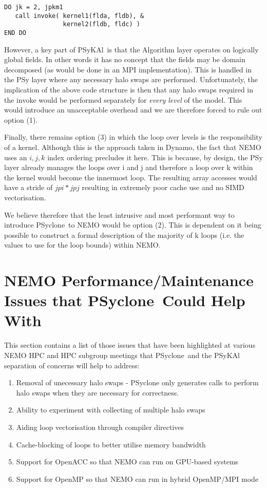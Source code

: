 \documentclass{article}
\newcommand{\psykal}{{PS}y{KA}l}
\newcommand{\psyclone}{{PS}yclone}
\begin{document}
\begin{verbatim}
DO jk = 2, jpkm1
   call invoke( kernel1(flda, fldb), &
                kernel2(fldb, fldc) )
END DO
\end{verbatim}

However, a key part of \psykal\ is that the Algorithm layer operates on
logically global fields. In other words it has no concept that the
fields may be domain decomposed (as would be done in an MPI
implementation). This is handled in the PSy layer where any necessary
halo swaps are performed. Unfortunately, the implication of the above
code structure is then that any halo swaps required in the invoke
would be performed separately for \emph{every level} of the
model. This would introduce an unacceptable overhead and we are
therefore forced to rule out option (1).

Finally, there remains option (3) in which the loop over levels is the
responsibility of a kernel. Although this is the approach taken in
Dynamo, the fact that NEMO uses an $i,j,k$ index ordering precludes it
here. This is because, by design, the PSy layer already manages the
loops over i and j and therefore a loop over k within the kernel would
become the innermost loop. The resulting array accesses would have a
stride of $jpi*jpj$ resulting in extremely poor cache use and no SIMD
vectorisation.

We believe therefore that the least intrusive and most performant way
to introduce \psyclone\ to NEMO would be option (2). This is dependent
on it being possible to construct a formal description of the majority
of k loops (i.e. the values to use for the loop bounds) within NEMO.

\section{NEMO Performance/Maintenance Issues that \psyclone\ Could Help With}

This section contains a list of those issues that have been
highlighted at various NEMO HPC and HPC subgroup meetings that
\psyclone\ and the PSyKAl separation of concerns will help to address:

\begin{enumerate}

\item Removal of unecessary halo swaps - PSyclone only generates calls to
  perform halo swaps when they are necessary for correctness.

\item Ability to experiment with collecting of multiple halo swaps
  
\item Aiding loop vectorisation through compiler directives

\item Cache-blocking of loops to better utilise memory bandwidth

\item Support for OpenACC so that NEMO can run on GPU-based systems

\item Support for OpenMP so that NEMO can run in hybrid OpenMP/MPI mode
  
\end{enumerate}
\end{document}

